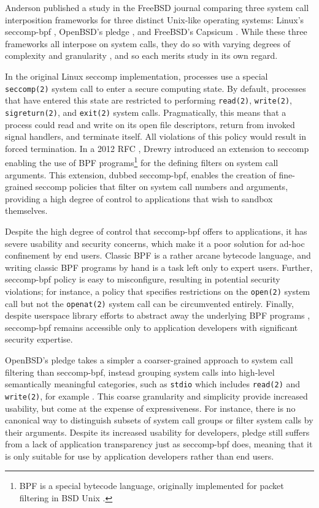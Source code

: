 \documentclass[dvipsnames, 12pt]{article}
\begin{document}
Anderson published a study in the FreeBSD journal \cite{anderson2017_comparison}
comparing three system call interposition frameworks for three distinct
Unix-like operating systems: Linux's seccomp-bpf
\cite{seccomp_bpf,drewry2012_seccomp_bpf}, OpenBSD's pledge \cite{pledge}, and
FreeBSD's Capsicum \cite{capsicum, watson2010_capsicum}. While these three
frameworks all interpose on system calls, they do so with varying degrees of
complexity and granularity \cite{anderson2017_comparison}, and so each merits
study in its own regard.

In the original Linux seccomp implementation, processes use a special
\texttt{seccomp(2)} system call to enter a secure computing state. By default,
processes that have entered this state are restricted to performing
\texttt{read(2)}, \texttt{write(2)}, \texttt{sigreturn(2)}, and \texttt{exit(2)}
system calls.  Pragmatically, this means that a process could read and write on
its open file descriptors, return from invoked signal handlers, and terminate
itself. All violations of this policy would result in forced termination. In
a 2012 RFC \cite{drewry2012_seccomp_bpf}, Drewry introduced an extension to
seccomp enabling the use of BPF programs\footnote{BPF is a special bytecode
language, originally implemented for packet filtering in BSD Unix
\cite{classic_bpf}.} for the defining filters on system call arguments. This
extension, dubbed seccomp-bpf, enables the creation of fine-grained seccomp
policies that filter on system call numbers and arguments, providing a high
degree of control to applications that wish to sandbox themselves.

Despite the high degree of control that seccomp-bpf offers to applications, it
has severe usability and security concerns, which make it a poor solution for
ad-hoc confinement by end users. Classic BPF \cite{classic_bpf} is a rather
arcane bytecode language, and writing classic BPF programs by hand is a task
left only to expert users. Further, seccomp-bpf policy is easy to misconfigure,
resulting in potential security violations; for instance, a policy that
specifies restrictions on the \texttt{open(2)} system call but not the
\texttt{openat(2)} system call can be circumvented entirely. Finally, despite
userspace library efforts to abstract away the underlying BPF programs
\cite{libseccomp}, seccomp-bpf remains accessible only to application developers
with significant security expertise.

OpenBSD's pledge \cite{pledge} takes a simpler a coarser-grained approach to
system call filtering than seccomp-bpf, instead grouping system calls into
high-level semantically meaningful categories, such as \texttt{stdio} which
includes \texttt{read(2)} and \texttt{write(2)}, for example
\cite{anderson2017_comparison}. This coarse granularity and simplicity provide
increased usability, but come at the expense of expressiveness. For instance,
there is no canonical way to distinguish subsets of system call groups or filter
system calls by their arguments.  Despite its increased usability for
developers, pledge still suffers from a lack of application transparency just as
seccomp-bpf does, meaning that it is only suitable for use by application
developers rather than end users.
\end{document}
